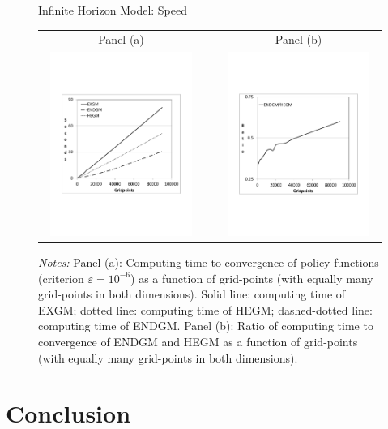\documentclass[a4paper,12pt]{article}
\begin{document}
\begin{figure}[htbp]
	\caption{Infinite Horizon Model: Speed}
	\label{graph_infinte}
	\centering
	\begin{tabular}{cC{1cm}c}
	Panel (a) & & Panel (b)  \\
	\includegraphics[height=6.0cm, width=6.0cm]{Abbildungen/seconds_Infinite.pdf} & & \includegraphics[height=6.0cm, width=6.0cm]{Abbildungen/Ratio_Infinite.pdf} \\
	\end{tabular}
	\caption*{\footnotesize{\emph{Notes:} Panel (a): Computing time to convergence of policy functions (criterion $\varepsilon=10^{-6}$) as a function of grid-points (with equally many grid-points in both dimensions). Solid line: computing time of EXGM; dotted line: computing time of HEGM; dashed-dotted line: computing time of ENDGM. Panel (b): Ratio of computing time to convergence of ENDGM and HEGM as a function of grid-points (with equally many grid-points in both dimensions).}}
\end{figure}

\clearpage

\section{Conclusion}
\end{document}
